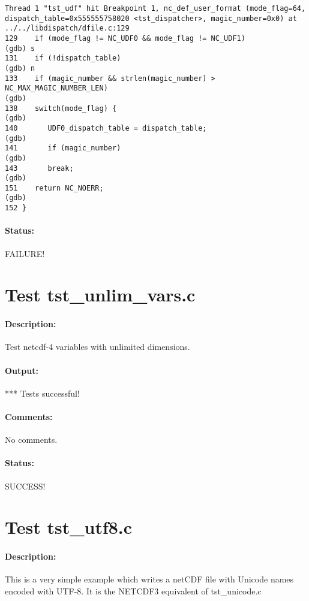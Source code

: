 \begin{verbatim}
Thread 1 "tst_udf" hit Breakpoint 1, nc_def_user_format (mode_flag=64, dispatch_table=0x555555758020 <tst_dispatcher>, magic_number=0x0) at ../../libdispatch/dfile.c:129
129	   if (mode_flag != NC_UDF0 && mode_flag != NC_UDF1)
(gdb) s
131	   if (!dispatch_table)
(gdb) n
133	   if (magic_number && strlen(magic_number) > NC_MAX_MAGIC_NUMBER_LEN)
(gdb)
138	   switch(mode_flag) {
(gdb)
140	      UDF0_dispatch_table = dispatch_table;
(gdb)
141	      if (magic_number)
(gdb)
143	      break;
(gdb)
151	   return NC_NOERR;
(gdb)
152	}
\end{verbatim}

\paragraph{Status:} FAILURE!

{\color{blue}{Help, Julian!}}

\section{Test tst\_unlim\_vars.c}

\paragraph{Description:} Test netcdf-4 variables with unlimited dimensions.

\paragraph{Output:} *** Tests successful!

\paragraph{Comments:} No comments.

\paragraph{Status:} SUCCESS!

\section{Test tst\_utf8.c}

\paragraph{Description:} This is a very simple example which writes a netCDF file with Unicode names encoded with UTF-8. It is the NETCDF3 equivalent of tst\_unicode.c

